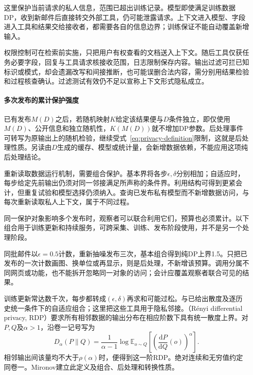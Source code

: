这里保护当前请求的私人信息，范围已超出训练记录。模型即使满足训练数据DP，收到新邮件后直接转交外部工具，仍可能泄露请求。上下文进入模型、字段进入工具和结果交给接收者，都需要各自的信息边界；训练保证不能自动覆盖新增输入。

权限控制可在检索前实施，只把用户有权查看的文档送入上下文。随后工具仅获任务必要字段，回复与工具请求核接收范围，日志限制保存内容。输出过滤可拦已知标识或模式，却会遗漏改写和间接推断，也可能误删合法内容，需分别用结果检验和过程核查确认。过滤测试有效仍不足以宣称上下文形式隐私成立。

\paragraph{多次发布的累计保护强度}
\label{sec:privacy-repeated-use}

已有发布$M(D)$之后，若随机映射$K$给定该结果便与$D$条件独立，即仅使用$M(D)$、公开信息和独立随机性，$K(M(D))$就不增加DP参数。后处理事件可转写为原输出上的随机检验，继续受式~\eqref{eq:privacy-definition}限制，这就是后处理性质。另读由$D$生成的缓存、模型或统计量，会新增数据依赖，不能应用这项纯后处理结论。

重新读取数据运行机制，需要组合保护。基本界将各步$\epsilon,\delta$分别相加；自适应时，每步给定先前输出仍须对同一邻接满足所声称的条件界。利用结构可得到更紧会计，但重复试验和模型选择仍须纳入。查询已发布私有模型而不新增数据访问，与每次重新读取私人上下文，属于不同过程。

同一保护对象影响多个发布时，观察者可以联合利用它们，预算也必须累计。以下组合用于训练更新和持续服务，可跨采集、训练、发布阶段使用，并不是另一个处理阶段。

同批邮件以$\epsilon=0.5$计数，重新抽噪发布三次，基本组合得到纯DP上界1.5。只把已发布的一次计数画图、换单位或再显示，则是后处理，不新增该预算。调用分属不同网页或功能，也不能拆开忽略同一对象的访问；会计应覆盖观察者联合可见的结果。

训练更新常达数千次，每步都转成$(\epsilon,\delta)$再求和可能过松。与已给出散度及逐历史统一条件下的自适应组合；这里把这些工具用于隐私邻接。（Rényi differential privacy, RDP）要求所有相邻数据的输出分布在相应阶数下具有统一散度上界。对$P,Q$及$\alpha>1$，沿卷一记号写为
\begin{equation}
 D_\alpha(P\|Q)=\frac{1}{\alpha-1}
 \log\mathbb E_{o\sim Q}
 \left[\left(\frac{\mathrm dP}{\mathrm dQ}(o)\right)^\alpha\right].
 \label{eq:privacy-renyi}
\end{equation}
相邻输出间该量均不大于$\rho(\alpha)$时，便得到这一阶RDP。绝对连续和无穷值约定同卷一。Mironov建立此定义及组合、后处理和转换性质。

